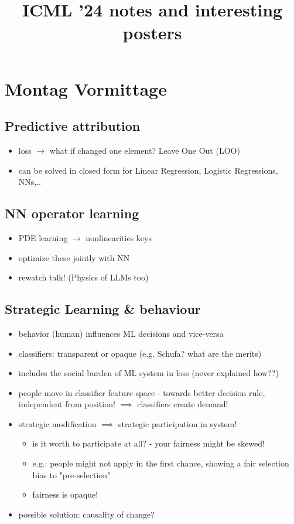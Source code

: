 \documentclass[a4paper]{article}
\title{ICML '24 notes and interesting posters}
\begin{document}
\maketitle

\section*{Montag Vormittage}
\subsection*{Predictive attribution}
\begin{itemize}
    \item loss $\rightarrow$ what if changed one element? Leave One Out (LOO)
    \item can be solved in closed form for Linear Regression, Logistic Regressions, NNs,..
\end{itemize}
\subsection*{NN operator learning}
\begin{itemize}
    \item PDE learning $\rightarrow$ nonlinearities keys
    \item optimize these jointly with NN
    \item rewatch talk! (Physics of LLMs too)
\end{itemize}
\subsection*{Strategic Learning \& behaviour}
\begin{itemize}
    \item behavior (human) influences ML decisions and vice-versa
    \item classifiers: transparent or opaque (e.g. Schufa? what are the merits)
    \item includes the social burden of ML system in loss (never explained how??)
    \item people move in classifier feature space - towards better decision rule, independent from position! $\implies$ classifiers create demand!
    \item strategic modification $\implies$ strategic participation in system!
          \begin{itemize}
              \item is it worth to participate at all? - your fairness might be skewed!
              \item e.g.: people might not apply in the first chance, showing a fair selection bias to "pre-selection"
              \item fairness is opaque!
          \end{itemize}
    \item possible solution: causality of change?
\end{itemize}
\end{document}
